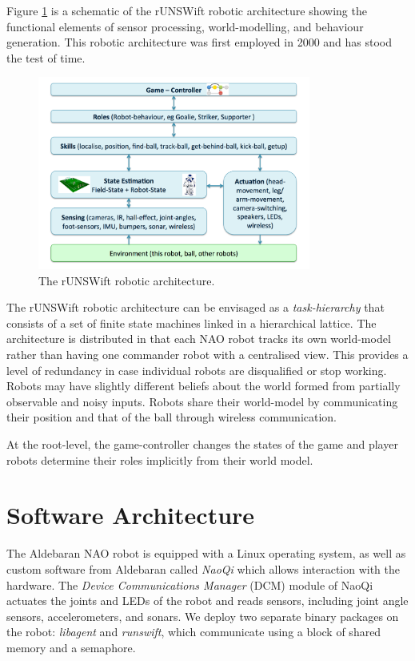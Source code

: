 \documentclass[runningheads,a4paper]{llncs}
\begin{document}
Figure \ref{figRobotArchitecture} is a schematic of the rUNSWift robotic architecture showing the functional elements of sensor processing, world-modelling, and behaviour generation. This robotic architecture was first employed in 2000 \cite{hengst2000unswunited} and has stood the test of time. 

\begin{figure}[!htp]
\centering
\includegraphics[width=0.8\textwidth]{Figures/figRobotArchitecture}
\caption{The rUNSWift robotic architecture.} \label{figRobotArchitecture}
\end{figure}

The rUNSWift robotic architecture can be envisaged as a \emph{task-hierarchy} that consists of a set of finite state machines linked in a hierarchical lattice. The architecture is distributed in that each NAO robot tracks its own world-model rather than having one commander robot with a centralised view. This provides a level of redundancy in case individual robots are disqualified or stop working. Robots may have slightly different beliefs about the world formed from partially observable and noisy inputs. Robots share their world-model by communicating their position and that of the ball through wireless communication. 

At the root-level, the game-controller changes the states of the game and player robots determine their roles implicitly from their world model. 






\section{Software Architecture}

The Aldebaran NAO robot is equipped with a Linux operating system, as well as custom software from Aldebaran called \emph{NaoQi} which allows interaction with the hardware. The \emph{Device Communications Manager} (DCM) module of NaoQi actuates the joints and LEDs of the robot and reads sensors, including joint angle sensors, accelerometers, and sonars. We deploy two separate binary packages on the robot: \emph{libagent} and \emph{runswift}, which communicate using a block of shared memory and a semaphore. 
\end{document}
